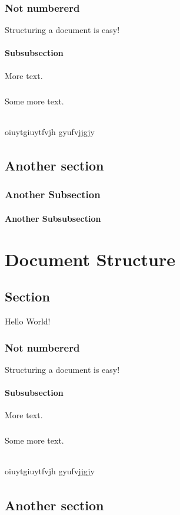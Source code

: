 \documentclass{book}
\begin{document}
	\subsection*{Not numbererd}
	Structuring a document is easy!
	\subsubsection{Subsubsection}
	More text.
	\paragraph{}
	Some more text.
	\subparagraph{}
	oiuytgiuytfvjh gyufvjjgjy
	
	\subparagraph{}
	\lipsum[1]
	\section{Another section}
	\subsection{Another Subsection}
	\subsubsection{Another Subsubsection}
	\lipsum[1-3]\chapter{Document Structure}
	\section{Section}
	Hello World!
	\subsection*{Not numbererd}
	Structuring a document is easy!
	\subsubsection{Subsubsection}
	More text.
	\paragraph{}
	Some more text.
	\subparagraph{}
	oiuytgiuytfvjh gyufvjjgjy
	

	
	\subparagraph{}
	\lipsum[1]
	\section{Another section}
\end{document}
